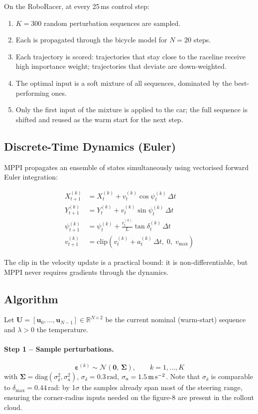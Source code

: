 \documentclass[11pt]{article}
\begin{document}
On the RoboRacer, at every 25\,ms control step:
\begin{enumerate}
  \item $K = 300$ random perturbation sequences are sampled.
  \item Each is propagated through the bicycle model for $N = 20$ steps.
  \item Each trajectory is scored: trajectories that stay close to the raceline
        receive high importance weight; trajectories that deviate are down-weighted.
  \item The optimal input is a soft mixture of all sequences, dominated by the
        best-performing ones.
  \item Only the first input of the mixture is applied to the car; the full
        sequence is shifted and reused as the warm start for the next step.
\end{enumerate}

\subsection{Discrete-Time Dynamics (Euler)}

MPPI propagates an ensemble of states simultaneously using vectorised forward
Euler integration:

\begin{align}
X_{t+1}^{(k)}   &= X_t^{(k)} + v_t^{(k)}\cos\psi_t^{(k)}\,\Delta t \\
Y_{t+1}^{(k)}   &= Y_t^{(k)} + v_t^{(k)}\sin\psi_t^{(k)}\,\Delta t \\
\psi_{t+1}^{(k)} &= \psi_t^{(k)} + \frac{v_t^{(k)}}{L}\tan\delta_t^{(k)}\,\Delta t \\
v_{t+1}^{(k)}   &= \mathrm{clip}\!\left(v_t^{(k)} + a_t^{(k)}\,\Delta t,\; 0,\; v_{\max}\right)
\end{align}

The $\mathrm{clip}$ in the velocity update is a practical bound: it is
non-differentiable, but MPPI never requires gradients through the dynamics.

\subsection{Algorithm}

Let $\bm{U} = [\bm{u}_0, \dots, \bm{u}_{N-1}] \in \mathbb{R}^{N \times 2}$
be the current nominal (warm-start) sequence and $\lambda > 0$ the temperature.

\paragraph{Step 1 -- Sample perturbations.}
\[
\bm{\varepsilon}^{(k)} \sim \mathcal{N}(\bm{0},\, \bm{\Sigma}), \qquad k = 1,\dots,K
\]
with $\bm{\Sigma} = \mathrm{diag}(\sigma_\delta^2, \sigma_a^2)$,
$\sigma_\delta = 0.3\,\text{rad}$, $\sigma_a = 1.5\,\text{m\,s}^{-2}$.  Note that
$\sigma_\delta$ is comparable to $\delta_{\max} = 0.44$\,rad: by 1$\sigma$ the
samples already span most of the steering range, ensuring the corner-radius
inputs needed on the figure-8 are present in the rollout cloud.
\end{document}
